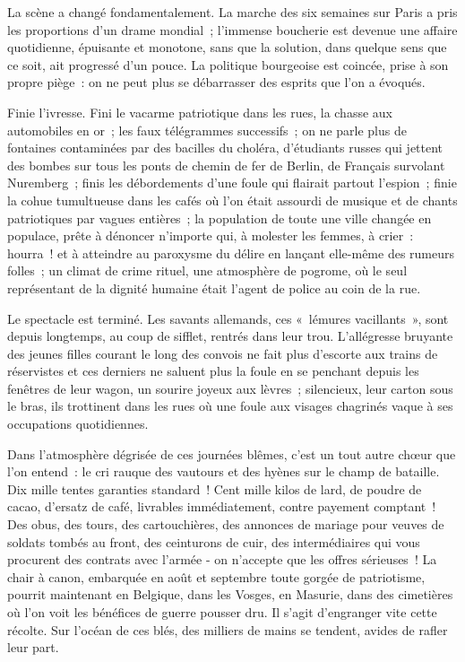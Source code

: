 \documentclass[french,twoside]{book} %
\begin{document}
\noindent La scène a changé fondamentalement. La marche des six semaines sur Paris a pris les proportions d’un drame mondial ; l’immense boucherie est devenue une affaire quotidienne, épuisante et monotone, sans que la solution, dans quelque sens que ce soit, ait progressé d’un pouce. La politique bourgeoise est coincée, prise à son propre piège : on ne peut plus se débarrasser des esprits que l’on a évoqués.\par
Finie l’ivresse. Fini le vacarme patriotique dans les rues, la chasse aux automobiles en or ; les faux télégrammes successifs ; on ne parle plus de fontaines contaminées par des bacilles du choléra, d’étudiants russes qui jettent des bombes sur tous les ponts de chemin de fer de Berlin, de Français survolant Nuremberg ; finis les débordements d’une foule qui flairait partout l’espion ; finie la cohue tumultueuse dans les cafés où l’on était assourdi de musique et de chants patriotiques par vagues entières ; la population de toute une ville changée en populace, prête à dénoncer n’importe qui, à molester les femmes, à crier : hourra ! et à atteindre au paroxysme du délire en lançant elle-même des rumeurs folles ; un climat de crime rituel, une atmosphère de pogrome, où le seul représentant de la dignité humaine était l’agent de police au coin de la rue.\par
Le spectacle est terminé. Les savants allemands, ces « lémures vacillants », sont depuis longtemps, au coup de sifflet, rentrés dans leur trou. L'allégresse bruyante des jeunes filles courant le long des convois ne fait plus d’escorte aux trains de réservistes et ces derniers ne saluent plus la foule en se penchant depuis les fenêtres de leur wagon, un sourire joyeux aux lèvres ; silencieux, leur carton sous le bras, ils trottinent dans les rues où une foule aux visages chagrinés vaque à ses occupations quotidiennes.\par
Dans l’atmosphère dégrisée de ces journées blêmes, c’est un tout autre chœur que l’on entend : le cri rauque des vautours et des hyènes sur le champ de bataille. Dix mille tentes garanties standard ! Cent mille kilos de lard, de poudre de cacao, d’ersatz de café, livrables immédiatement, contre payement comptant ! Des obus, des tours, des cartouchières, des annonces de mariage pour veuves de soldats tombés au front, des ceinturons de cuir, des intermédiaires qui vous procurent des contrats avec l’armée - on n’accepte que les offres sérieuses ! La chair à canon, embarquée en août et septembre toute gorgée de patriotisme, pourrit maintenant en Belgique, dans les Vosges, en Masurie, dans des cimetières où l’on voit les bénéfices de guerre pousser dru. Il s’agit d’engranger vite cette récolte. Sur l’océan de ces blés, des milliers de mains se tendent, avides de rafler leur part.\par
\end{document}
